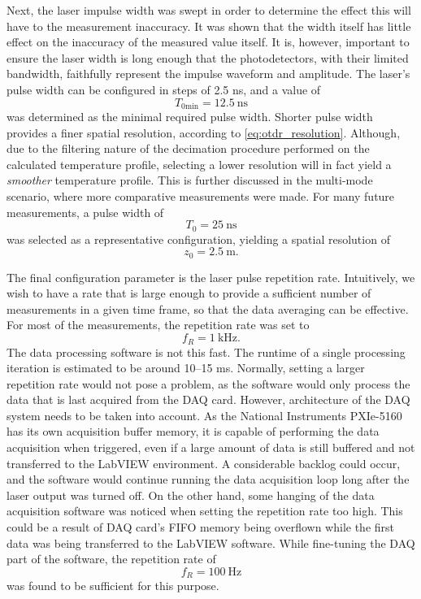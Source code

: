 \documentclass{standalone}
\begin{document}
Next, the laser impulse width was swept in order to determine the effect this will have to the measurement inaccuracy. It was shown that the width itself has little effect on the inaccuracy of the measured value itself. It is, however, important to ensure the laser width is long enough that the photodetectors, with their limited bandwidth, faithfully represent the impulse waveform and amplitude. The laser's pulse width can be configured in steps of 2.5 ns, and a value of
\begin{equation}
T_{0\textrm{min}} = \SI{12.5}{\nano \second}
\end{equation}
was determined as the minimal required pulse width. Shorter pulse width provides a finer spatial resolution, according to \ref{eq:otdr_resolution}. Although, due to the filtering nature of the decimation procedure performed on the calculated temperature profile, selecting a lower resolution will in fact yield a \textit{smoother} temperature profile. This is further discussed in the multi-mode scenario, where more comparative measurements were made. For many future measurements, a pulse width of
\begin{equation}
T_0 = \SI{25}{\nano \second}
\end{equation}
was selected as a representative configuration, yielding a spatial resolution of
\begin{equation}
z_0 = \SI{2.5}{\meter} \textrm{.}
\end{equation}

The final configuration parameter is the laser pulse repetition rate. Intuitively, we wish to have a rate that is large enough to provide a sufficient number of measurements in a given time frame, so that the data averaging can be effective. For most of the measurements, the repetition rate was set to
\begin{equation}
f_R = \SI{1}{\kilo \hertz} \textrm{.}
\end{equation}
The data processing software is not this fast. The runtime of a single processing iteration is estimated to be around 10--15 ms. Normally, setting a larger repetition rate would not pose a problem, as the software would only process the data that is last acquired from the DAQ card. However, architecture of the DAQ system needs to be taken into account. As the National Instruments PXIe-5160 has its own acquisition buffer memory, it is capable of performing the data acquisition when triggered, even if a large amount of data is still buffered and not transferred to the LabVIEW environment. A considerable backlog could occur, and the software would continue running the data acquisition loop long after the laser output was turned off. On the other hand, some hanging of the data acquisition software was noticed when setting the repetition rate too high. This could be a result of DAQ card's FIFO memory being overflown while the first data was being transferred to the LabVIEW software. While fine-tuning the DAQ part of the software, the repetition rate of
\begin{equation}
f_R = \SI{100}{\hertz}
\end{equation}
was found to be sufficient for this purpose. \\
\end{document}
